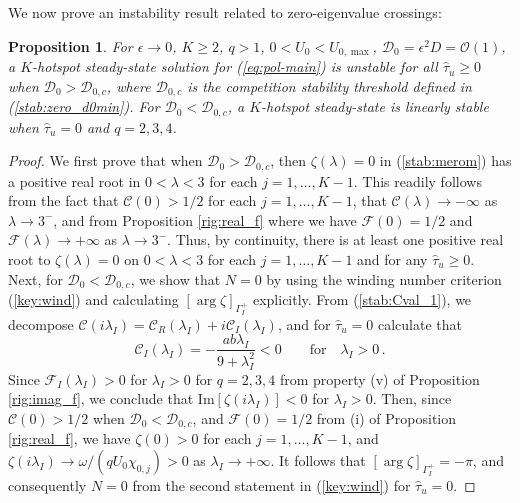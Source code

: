 \documentclass{article}%
\newtheorem{prop}[theorem]{Proposition}
\begin{document}
\noindent We now prove an instability result related to
zero-eigenvalue crossings:

\begin{prop}
\label{prop:comp_t} For $\epsilon\to 0$, $K\geq 2$, $q>1$, 
$0<U_0<U_{0,\max}$, ${\mathcal D}_0=\epsilon^2 D = {\mathcal
  O}(1)$, a $K$-hotspot steady-state solution for (\ref{eq:pol-main})
is unstable for all $\hat{\tau}_u\geq 0$ when ${\mathcal
  D}_0>{\mathcal D}_{0,c}$, where ${\mathcal D}_{0,c}$ is the
competition stability threshold defined in
(\ref{stab:zero_d0min}). For ${\mathcal D}_0<{\mathcal D}_{0,c}$, a
$K$-hotspot steady-state is linearly stable when $\hat{\tau}_u=0$ and
$q=2,3,4$.
\end{prop}

\begin{proof} We first prove that when ${\mathcal D}_0>{\mathcal D}_{0,c}$,
then $\zeta(\lambda)=0$ in (\ref{stab:merom}) has a positive real root
in $0<\lambda<3$ for each $j=1,\ldots,K-1$. This readily follows from
the fact that ${\mathcal C}(0)>{1/2}$ for each $j=1,\ldots,K-1$, that
${\mathcal C}(\lambda)\to -\infty$ as $\lambda\to 3^{-}$, and
from Proposition \ref{rig:real_f} where we have ${\mathcal
  F}(0)={1/2}$ and ${\mathcal F}(\lambda)\to +\infty$ as $\lambda\to
3^{-}$. Thus, by continuity, there is at least one positive real root
to $\zeta(\lambda)=0$ on $0<\lambda<3$ for each $j=1,\ldots,K-1$ and
for any $\hat{\tau}_u\geq 0$. Next, for ${\mathcal D}_0<{\mathcal
  D}_{0,c}$, we show that $N=0$ by using the winding number
criterion (\ref{key:wind}) and calculating $\left[\arg \zeta
  \right]_{\Gamma_I^{+}}$ explicitly.  From (\ref{stab:Cval_1}), we
decompose ${\mathcal C}(i\lambda_I)={\mathcal C}_R(\lambda_I) +
i{\mathcal C}_I(\lambda_I)$, and for $\hat{\tau}_u=0$ calculate that
\begin{equation*}
   {\mathcal C}_I(\lambda_I) = -\frac{ a b \lambda_I}{9+\lambda_I^2} < 0
\qquad \mbox{for} \quad \lambda_I>0 \,.
\end{equation*}
Since ${\mathcal F}_I(\lambda_I)>0$ for $\lambda_I>0$ for $q=2,3,4$ from
property (v) of Proposition \ref{rig:imag_f}, we conclude that
$\mbox{Im}\left[\zeta(i\lambda_I)\right]<0$ for $\lambda_I>0$. Then, since
${\mathcal C}(0)>{1/2}$ when ${\mathcal D}_0<{\mathcal D}_{0,c}$,
and ${\mathcal F}(0)={1/2}$ from (i) of Proposition \ref{rig:real_f}, 
we have $\zeta(0)>0$ for each $j=1,\ldots,K-1$, and $\zeta(i\lambda_I)
\to {\omega/(qU_0\chi_{0,j})}>0$ as $\lambda_I\to +\infty$. It follows that
$\left[\arg \zeta \right]_{\Gamma_I^{+}}=-\pi$, and consequently $N=0$ from
the second statement in (\ref{key:wind}) for $\hat{\tau}_u=0$.
\end{proof}
\end{document}
